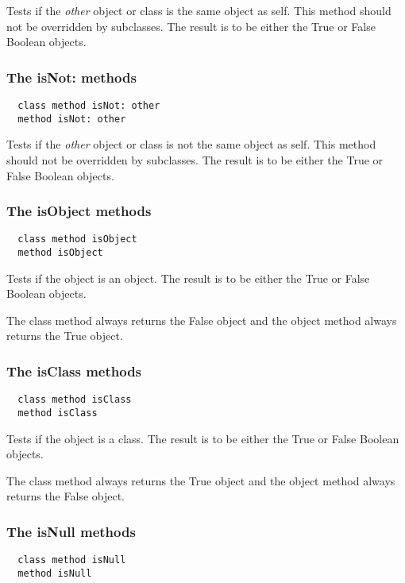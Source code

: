 Tests if the \textit{other} object or class is the same object as self. This method should not be overridden by subclasses. The result is to be either the True or False Boolean objects.

\hfill
\subsubsection {The isNot: methods}
\begin{lstlisting}
  class method isNot: other
  method isNot: other
\end{lstlisting}

Tests if the \textit{other} object or class is not the same object as self. This method should not be overridden by subclasses. The result is to be either the True or False Boolean objects.

\hfill
\subsubsection {The isObject methods}
\begin{lstlisting}
  class method isObject
  method isObject
\end{lstlisting}

Tests if the object is an object. The result is to be either the True or False Boolean objects.

The class method always returns the False object and the object method always returns the True object.

\hfill
\subsubsection {The isClass methods}
\begin{lstlisting}
  class method isClass
  method isClass
\end{lstlisting}

Tests if the object is a class. The result is to be either the True or False Boolean objects.

The class method always returns the True object and the object method always returns the False object.

\hfill
\subsubsection {The isNull methods}
\begin{lstlisting}
  class method isNull
  method isNull
\end{lstlisting}

